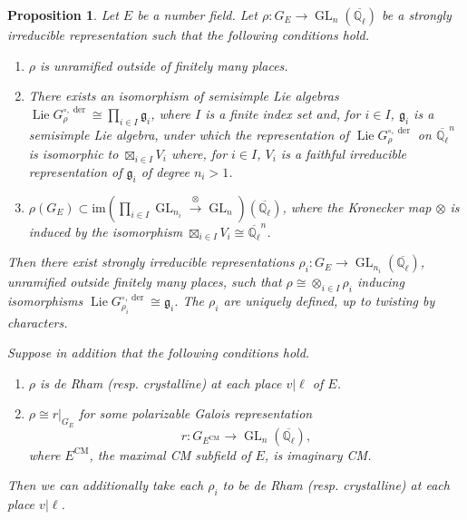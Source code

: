 \documentclass{amsart}
\newtheorem{proposition}[theorem]{Proposition}
\theoremstyle{definition}
\numberwithin{equation}{section} %
\newcommand{\GL}{\operatorname{GL}}
\newcommand{\Lie}{\operatorname{Lie}}
\newcommand{\der}{\operatorname{der}}
\newcommand{\Qlbar}{\ensuremath{\overline{\mathbb{Q}_\ell}}}
\newcommand{\mf}[1]{\mathfrak{#1}}
\begin{document}
\begin{proposition}\label{proposition: decompose Galois rep as tensor product}
    Let \( E \) be a number field. 
    Let \( \rho:G_E\to\GL_{n}(\Qlbar) \) be a strongly irreducible representation such that the following conditions hold.
    \begin{enumerate}
        \item $\rho$ is unramified outside of finitely many places.
        \item There exists an isomorphism of semisimple Lie algebras  $\Lie G_{\rho}^{\circ,\der}  \cong \prod_{i \in I} \mf{g}_i$, where $I$ is a finite index set and, for $i \in I$, $\mf{g}_i$ is a semisimple Lie algebra, under which the representation of $\Lie G_{\rho}^{\circ,\der}$ on $\Qlbar^n$ is isomorphic to $\boxtimes_{i \in I} V_i$ where, for $i \in I$, $V_i$ is a faithful irreducible representation of $\mf{g}_i$ of degree $n_i > 1$.
        \item $\rho(G_E) \subset \mathrm{im}(\prod_{i \in I} \GL_{n_i} \xrightarrow{\otimes} \GL_n)(\Qlbar)$, where the Kronecker map $\otimes$ is induced by the isomorphism $\boxtimes_{i \in I} V_i \cong \Qlbar^n$.
    \end{enumerate}
    Then there exist strongly irreducible representations \( \rho_i: G_{E}\to \GL_{n_i}(\Qlbar) \), unramified outside finitely many places, such that \(\rho \cong \otimes_{i \in I} \rho_i\) inducing isomorphisms $\Lie G_{\rho_i}^{\circ,\der} \cong \mf{g}_i$.
    The $\rho_i$ are uniquely defined, up to twisting by characters.

    Suppose in addition that the following conditions hold.
    \begin{enumerate}[resume]
        \item $\rho$ is de Rham (resp. crystalline) at each place $v|\ell$ of $E$.
        \item $\rho \cong r|_{G_E}$ for some polarizable Galois representation
        \[
        r: G_{E^{\mathrm{CM}}} \to \GL_n(\Qlbar),
        \]
        where $E^{\mathrm{CM}}$, the maximal CM subfield of $E$, is imaginary CM.
    \end{enumerate}
     Then we can additionally take each $\rho_i$ to be de Rham (resp. crystalline) at each place $v|\ell$.
\end{proposition}
\end{document}
